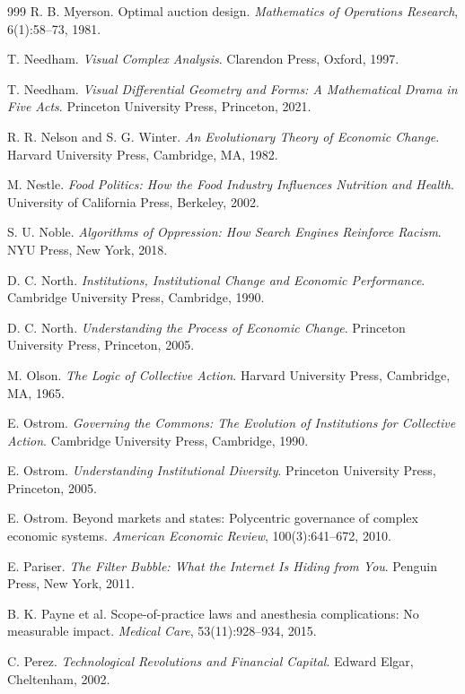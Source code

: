 \documentclass[11pt]{article}
\begin{document}
\begin{thebibliography}{999}
R. B. Myerson.
Optimal auction design.
\textit{Mathematics of Operations Research}, 6(1):58--73, 1981.

T. Needham.
\textit{Visual Complex Analysis}.
Clarendon Press, Oxford, 1997.

T. Needham.
\textit{Visual Differential Geometry and Forms: A Mathematical Drama in Five Acts}.
Princeton University Press, Princeton, 2021.

R. R. Nelson and S. G. Winter.
\textit{An Evolutionary Theory of Economic Change}.
Harvard University Press, Cambridge, MA, 1982.

M. Nestle.
\textit{Food Politics: How the Food Industry Influences Nutrition and Health}.
University of California Press, Berkeley, 2002.

S. U. Noble.
\textit{Algorithms of Oppression: How Search Engines Reinforce Racism}.
NYU Press, New York, 2018.

D. C. North.
\textit{Institutions, Institutional Change and Economic Performance}.
Cambridge University Press, Cambridge, 1990.

D. C. North.
\textit{Understanding the Process of Economic Change}.
Princeton University Press, Princeton, 2005.

M. Olson.
\textit{The Logic of Collective Action}.
Harvard University Press, Cambridge, MA, 1965.

E. Ostrom.
\textit{Governing the Commons: The Evolution of Institutions for Collective Action}.
Cambridge University Press, Cambridge, 1990.

E. Ostrom.
\textit{Understanding Institutional Diversity}.
Princeton University Press, Princeton, 2005.

E. Ostrom.
Beyond markets and states: Polycentric governance of complex economic systems.
\textit{American Economic Review}, 100(3):641--672, 2010.

E. Pariser.
\textit{The Filter Bubble: What the Internet Is Hiding from You}.
Penguin Press, New York, 2011.

B. K. Payne et al.
Scope-of-practice laws and anesthesia complications: No measurable impact.
\textit{Medical Care}, 53(11):928--934, 2015.

C. Perez.
\textit{Technological Revolutions and Financial Capital}.
Edward Elgar, Cheltenham, 2002.


\end{thebibliography}
\end{document}
